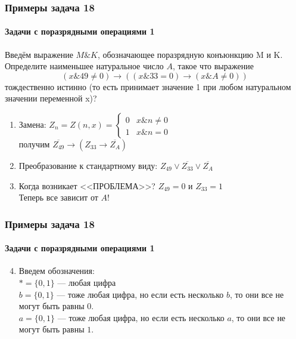 \begin{frame}[t]
\frametitle{Примеры задача 18}
\framesubtitle{Задачи с поразрядными операциями 1}

Введём выражение $M \& K$, обозначающее поразрядную конъюнкцию M и K. Определите наименьшее натуральное число $A$, такое что выражение
$$( x \& 49 \neq 0) \rightarrow ((x \& 33 = 0) \rightarrow (x \& A \neq 0))$$
тождественно истинно (то есть принимает значение 1 при любом натуральном значении переменной x)?

	\begin{enumerate}
		\item Замена: $Z_{n}=Z(n,x)=\begin{cases}
0 & x\&n\neq0\\
1 & x\&n=0
\end{cases}$ \\ 	\pause 
получим $\overline{Z_{49}} \rightarrow (Z_{33} \rightarrow \overline{Z_A})$
		\item Преобразование к стандартному виду: 
		$Z_{49} \vee \overline{Z_{33}} \vee \overline{Z_A}$ 	\pause 
		\item Когда возникает <<ПРОБЛЕМА>>?  	
		      $Z_{49}=0$ и $Z_{33}=1$ \\Теперь все зависит от $A$!
					
	\end{enumerate}
	
	
\end{frame}

\begin{frame}[t]
\frametitle{Примеры задача 18}
\framesubtitle{Задачи с поразрядными операциями 1}

	\begin{enumerate}
	\setcounter{enumi}{3}
		\item Введем обозначения:\\
		$*=\{0,1\}$ --- любая цифра\\ 	\pause 
		$b=\{0,1\}$ --- тоже любая цифра, но если есть несколько $b$, то они все не могут быть равны $0$.\\ 	\pause 
		$a=\{0,1\}$ --- тоже любая цифра, но если есть несколько $a$, то они все не могут быть равны $1$.\\ 
					
	\end{enumerate}
	
	
\end{frame}


